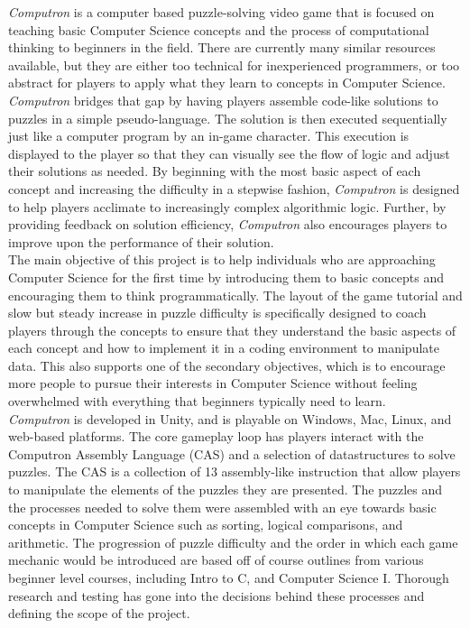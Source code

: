\textit{Computron} is a computer based puzzle-solving video game that is focused
on teaching basic Computer Science concepts and the process of computational
thinking to beginners in the field. There are currently many similar resources
available, but they are either too technical for inexperienced programmers, or
 too abstract for players to apply what they learn to concepts in Computer
Science. \textit{Computron} bridges that gap by having players assemble code-like
solutions to puzzles in a simple pseudo-language. The solution is then executed
sequentially just like a computer program by an in-game character. This
execution is displayed to the player so that they can visually see the flow of
logic and adjust their solutions as needed. By beginning with the most basic
aspect of each concept and increasing the difficulty in a stepwise fashion,
\textit{Computron} is designed to help players acclimate to increasingly complex
algorithmic logic. Further, by providing feedback on solution efficiency,
\textit{Computron} also encourages players to improve upon the performance of
their solution.\\

The main objective of this project is to help individuals who are approaching
Computer Science for the first time by introducing them to basic concepts and
encouraging them to think programmatically. The layout of the game tutorial
and slow but steady increase in puzzle difficulty is specifically designed to coach
players through the concepts to ensure that they understand the basic aspects
of each concept and how to implement it in a coding environment to manipulate
data. This also supports one of the secondary objectives, which is to encourage
more people to pursue their interests in Computer Science without feeling
overwhelmed with everything that beginners typically need to learn.\\

\textit{Computron} is developed in Unity, and is playable on Windows, Mac, Linux, 
and web-based platforms. The core gameplay loop has players interact with the 
Computron Assembly Language (CAS) and a selection of datastructures to solve puzzles.
The CAS is a collection of 13 assembly-like instruction that allow players to manipulate
the elements of the puzzles they are presented. The puzzles and the 
processes needed to solve them were assembled with an eye towards basic concepts in Computer 
Science such as sorting, logical comparisons, and arithmetic. The progression of puzzle difficulty 
and the order in which each game mechanic would be introduced are based off of course outlines from
various beginner level courses, including Intro to C, and Computer Science I. Thorough research and testing has 
gone into the decisions behind these processes and defining the scope of the project.\\